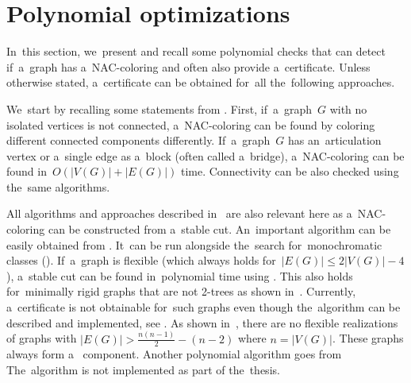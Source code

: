 \section{Polynomial optimizations}%
\label{sec:polynomial_optimizations}

In~this section, we~present and recall some polynomial checks
that can detect if~a~graph has a~NAC-coloring and often also provide a~certificate.
Unless otherwise stated, a~certificate can be obtained for~all the~following approaches.

We~start by recalling some statements from .
%
First, if~a~graph~\( G \) with no isolated vertices is not connected,
a~NAC-coloring can be found by coloring different connected components differently.
%
If~a~graph~\( G \) has an~articulation vertex or
a~single edge as a~block (often called a~bridge),
a~NAC-coloring can be found in~\( O(|V(G)|+|E(G)|) \) time.
Connectivity can be also checked using the~same algorithms.

All algorithms and approaches described in~
are also relevant here as a~NAC-coloring can be constructed from a~stable cut.
An~important algorithm can be easily obtained from .
It~can be run alongside the~search for~monochromatic classes ().
%
If~a~graph is flexible (which always holds for~\( |E(G)| \le 2|V(G)|-4 \)),
a~stable cut can be found in~polynomial time using .
This also holds for~minimally rigid graphs that are not 2-trees as shown in~.
Currently, a~certificate is not obtainable for~such graphs
even though the~algorithm can be described and implemented, see .
%
As shown in~\cite{legersky_original}, there are no flexible realizations
of graphs with \( |E(G)| > \frac{n(n-1)}{2} - (n-2) \) where \( n = |V(G)| \).
These graphs always form a~\trcon{} component.
%
Another polynomial algorithm goes from 
The~algorithm is not implemented as part of the~thesis.

